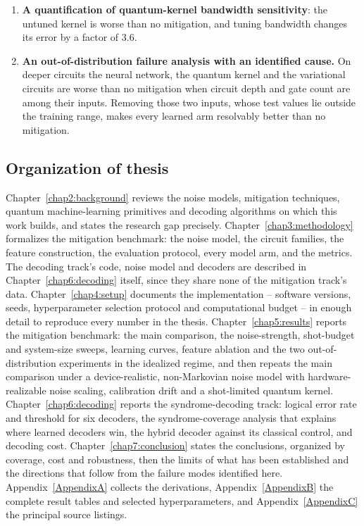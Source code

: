 \documentclass[Thesis.tex]{subfiles}
\begin{document}
\begin{enumerate}
    \item \textbf{A quantification of quantum-kernel bandwidth sensitivity}: the
    untuned kernel is worse than no mitigation, and tuning bandwidth changes its error
    by a factor of $3.6$.

    \item \textbf{An out-of-distribution failure analysis with an identified cause.}
    On deeper circuits the neural network, the quantum kernel and the variational
    circuits are worse than no mitigation when circuit depth and gate count are among
    their inputs. Removing those two inputs, whose test values lie outside the
    training range, makes every learned arm resolvably better than no mitigation.
\end{enumerate}

\subsection{Organization of thesis}

Chapter~\ref{chap2:background} reviews the noise models, mitigation techniques,
quantum machine-learning primitives and decoding algorithms on which this work
builds, and states the research gap precisely.
Chapter~\ref{chap3:methodology} formalizes the mitigation benchmark: the noise
model, the circuit families, the feature construction, the evaluation protocol,
every model arm, and the metrics. The decoding track's code, noise model and
decoders are described in Chapter~\ref{chap6:decoding} itself, since they share
none of the mitigation track's data.
Chapter~\ref{chap4:setup} documents the implementation -- software versions, seeds,
hyperparameter selection protocol and computational budget -- in enough detail to
reproduce every number in the thesis.
Chapter~\ref{chap5:results} reports the mitigation benchmark: the main comparison,
the noise-strength, shot-budget and system-size sweeps, learning curves, feature
ablation and the two out-of-distribution experiments in the idealized regime, and
then repeats the main comparison under a device-realistic, non-Markovian noise model
with hardware-realizable noise scaling, calibration drift and a shot-limited
quantum kernel.
Chapter~\ref{chap6:decoding} reports the syndrome-decoding track: logical error
rate and threshold for six decoders, the syndrome-coverage analysis that explains
where learned decoders win, the hybrid decoder against its classical control, and
decoding cost.
Chapter~\ref{chap7:conclusion} states the conclusions, organized by coverage, cost
and robustness, then the limits of what has been established and the directions that
follow from the failure modes identified here.
Appendix~\ref{AppendixA} collects the derivations,
Appendix~\ref{AppendixB} the complete result tables and selected hyperparameters,
and Appendix~\ref{AppendixC} the principal source listings.
\end{document}
